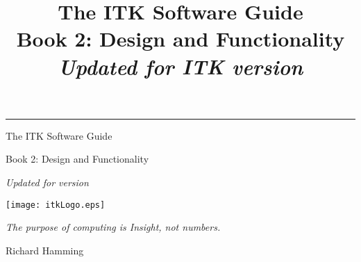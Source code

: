 \documentclass{InsightSoftwareGuide}
\title{The ITK Software Guide\\Book 2: Design and Functionality\\ \emph{Updated for ITK version
\ITKVERSIONMAJORMINOR}}
\begin{document}
\ifitkPrintedVersionFirstPage

  \begin{minipage}[t][3cm][b]{\textwidth}
  \rule{14cm}{1pt}
  \end{minipage}

  \begin{minipage}[t][3cm][b]{\textwidth}
  \Huge
  The ITK Software Guide
  \par
  \Large
  Book 2: Design and Functionality\\
  \normalsize
  \par
  \emph{Updated for version \ITKVERSIONMAJORMINOR}\\

  \end{minipage}


\fi

\maketitle
\ifitkPrintedVersion
\fi

\frontmatter


\ifitkPrintedVersion
  
  
\fi

%
%
%
\cleardoublepage

\begin{minipage}[t][10cm][b]{\textwidth}
\center
\texttt{[image: itkLogo.eps]}
\large
\begin{center}
\emph{The purpose of computing is Insight, not numbers.}\\
\end{center}
\hspace{8cm} Richard Hamming
\normalsize
\end{minipage}



%
\pagestyle{plain}
%


\ifitkPrintedVersion
  
\fi
\end{document}
